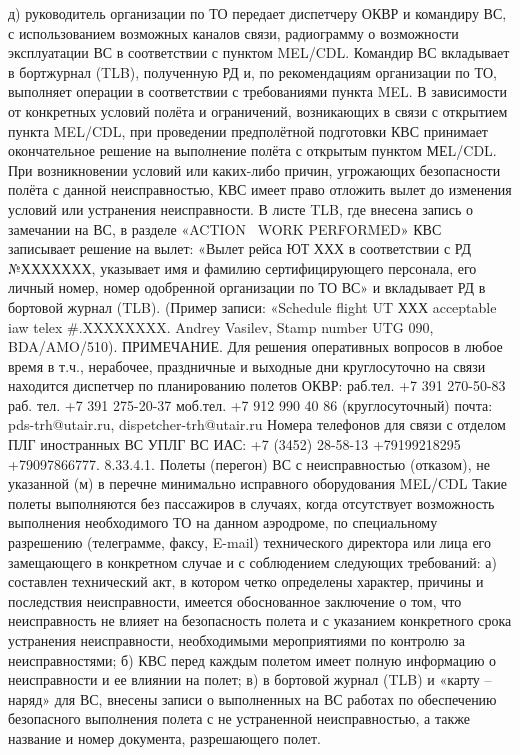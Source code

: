 д)	руководитель организации по ТО передает диспетчеру ОКВР и командиру ВС, с использованием возможных каналов связи, радиограмму о возможности эксплуатации ВС в соответствии с пунктом MEL/CDL.
Командир ВС вкладывает в бортжурнал (TLB), полученную РД и, по рекомендациям организации по ТО, выполняет операции в соответствии с требованиями пункта MEL.
В зависимости от конкретных условий полёта и ограничений, возникающих в связи с открытием пункта MEL/CDL, при проведении предполётной подготовки КВС принимает окончательное решение на выполнение полёта с открытым пунктом МЕL/CDL. При возникновении условий или каких-либо причин, угрожающих безопасности полёта с данной неисправностью, КВС имеет право отложить вылет до изменения условий или устранения неисправности.
В листе TLB, где внесена запись о замечании на ВС, в разделе «ACTION \ WORK PERFORMED» КВС записывает решение на вылет: «Вылет рейса ЮТ ХХХ в соответствии с РД №ХХХХХХХ, указывает имя и фамилию сертифицирующего персонала, его личный номер, номер одобренной организации по ТО ВС» и вкладывает РД в бортовой журнал (TLB).
 (Пример записи: «Schedule flight UT ХХХ acceptable iaw telex #.XXXXXXXX. Andrey Vasilev, Stamp number UTG 090, BDA/AMO/510).
ПРИМЕЧАНИЕ. Для решения оперативных вопросов в любое время в т.ч., нерабочее, праздничные и выходные дни круглосуточно на связи находится диспетчер по планированию полетов ОКВР:
раб.тел. +7 391 270-50-83
раб. тел. +7 391 275-20-37
моб.тел. +7 912 990 40 86 (круглосуточный)
почта: pds-trh@utair.ru, dispetcher-trh@utair.ru
Номера телефонов для связи с отделом ПЛГ иностранных ВС УПЛГ ВС ИАС: 
+7 (3452) 28-58-13
+79199218295
+79097866777. 
8.33.4.1.	Полеты (перегон) ВС с неисправностью (отказом), не указанной (м) в перечне минимально исправного оборудования MEL/CDL
Такие полеты выполняются без пассажиров в случаях, когда отсутствует возможность выполнения необходимого ТО на данном аэродроме, по специальному разрешению (телеграмме, факсу, E-mail) технического директора или лица его замещающего в конкретном случае и с соблюдением следующих требований:
а)	составлен технический акт, в котором четко определены характер, причины и последствия неисправности, имеется обоснованное заключение о том, что неисправность не влияет на безопасность полета и с указанием конкретного срока устранения неисправности, необходимыми мероприятиями по контролю за неисправностями;
б)	КВС перед каждым полетом имеет полную информацию о неисправности и ее влиянии на полет;
в)	в бортовой журнал (TLB) и «карту – наряд» для ВС, внесены записи о выполненных на ВС работах по обеспечению безопасного выполнения полета с не устраненной неисправностью, а также название и номер документа, разрешающего полет.
